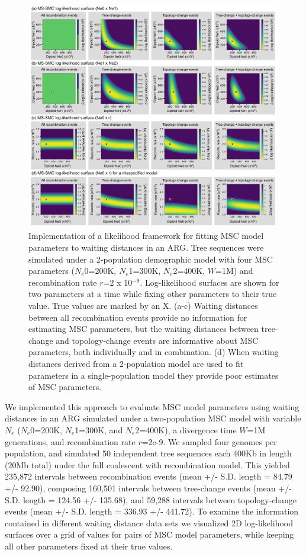 \documentclass[11pt]{article}
\begin{document}
\begin{figure}[p]
	\centering
	\includegraphics[width=0.99\textwidth]{figures/current/Fig7-likelihood-surfaces-MCMC3.pdf}
	\caption{
		Implementation of a likelihood framework for fitting MSC model parameters
		to waiting distances in an ARG. Tree sequences were simulated under a 
		2-population demographic model with four MSC parameters ($N_e$0=200K, 
		$N_e$1=300K, $N_e$2=400K, $W$=1M) and recombination rate $r$=2 x 10$^{-9}$. 
		Log-likelihood surfaces are shown for two parameters at a time while fixing
		other parameters to their true value. True values are marked by an X.
		(a-c) Waiting distances between all recombination events provide no information
		for estimating MSC parameters, but the waiting distances between tree-change 
		and topology-change events are informative about MSC parameters, both
		individually and in combination.
		(d) When waiting distances derived from a 2-population model are used to 
		fit parameters in a single-population model they provide poor estimates
		of MSC parameters.
	}
	\label{fig:likelihood-surfaces}
\end{figure}


We implemented this approach to evaluate MSC model parameters 
using waiting distances in an ARG simulated under a two-population MSC model with 
variable $N_e$ ($N_e$0=200K, $N_e$1=300K, and $N_e$2=400K), a divergence time
$W$=1M generations, and recombination rate $r$=2e-9. We sampled four 
genomes per population, and simulated 50 independent tree sequences 
each 400Kb in length (20Mb total) under the full coalescent with 
recombination model.
This yielded 235,872 intervals between recombination events
(mean +/- S.D. length = 84.79 +/- 92.90), composing 
160,501 intervals between tree-change events
(mean +/- S.D. length = 124.56 +/- 135.68),
and 59,288 intervals between topology-change events
(mean +/- S.D. length = 336.93 +/- 441.72).
To examine the information contained in different waiting distance data
sets we visualized 2D log-likelihood surfaces over a grid of 
values for pairs of MSC model parameters, while keeping all other 
parameters fixed at their true values.
\end{document}
